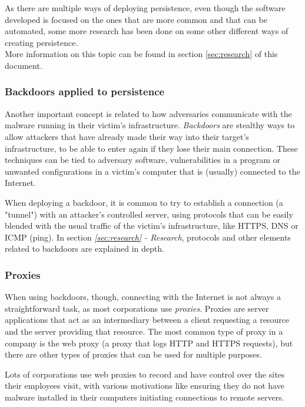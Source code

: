 As there are multiple ways of deploying persistence, even though the software developed is focused on the ones that are more common and that can be automated, some more research has been done on some other different ways of creating persistence. \\More information on this topic can be found in section \ref{sec:research} of this document.

\subsubsection{Backdoors applied to persistence}
\label{sssec:backdoors}

Another important concept is related to how adversaries communicate with the malware running in their victim's infrastructure. \textit{Backdoors} are stealthy ways to allow attackers that have already made their way into their target's infrastructure, to be able to enter again if they lose their main connection. These techniques can be tied to adversary software, vulnerabilities in a program or unwanted configurations in a victim's computer that is (usually) connected to the Internet. 

When deploying a backdoor, it is common to try to establish a connection (a "tunnel") with an attacker's controlled server, using protocols that can be easily blended with the usual traffic of the victim's infrastructure, like HTTPS, DNS or ICMP (ping). In section \textit{\ref{sec:research} - Research}, protocols and other elements related to backdoors are explained in depth.

\subsubsection{Proxies}
\label{sssec:proxies}
When using backdoors, though, connecting with the Internet is not always a straightforward task, as most corporations use \textit{proxies}. Proxies are server applications that act as an intermediary between a client requesting a resource and the server providing that resource. The most common type of proxy in a company is the web proxy (a proxy that logs HTTP and HTTPS requests), but there are other types of proxies that can be used for multiple purposes.

Lots of corporations use web proxies to record and have control over the sites their employees visit, with various motivations like ensuring they do not have malware installed in their computers initiating connections to remote servers.

